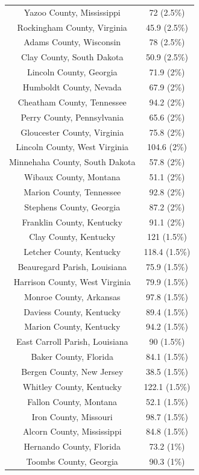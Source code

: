 \begin{table}[ht]
\begin{tabular}{cc}
  Yazoo County, Mississippi & 72 (2.5\%) \\ 
  Rockingham County, Virginia & 45.9 (2.5\%) \\ 
  Adams County, Wisconsin & 78 (2.5\%) \\ 
  Clay County, South Dakota & 50.9 (2.5\%) \\ 
  Lincoln County, Georgia & 71.9 (2\%) \\ 
  Humboldt County, Nevada & 67.9 (2\%) \\ 
  Cheatham County, Tennessee & 94.2 (2\%) \\ 
  Perry County, Pennsylvania & 65.6 (2\%) \\ 
  Gloucester County, Virginia & 75.8 (2\%) \\ 
  Lincoln County, West Virginia & 104.6 (2\%) \\ 
  Minnehaha County, South Dakota & 57.8 (2\%) \\ 
  Wibaux County, Montana & 51.1 (2\%) \\ 
  Marion County, Tennessee & 92.8 (2\%) \\ 
  Stephens County, Georgia & 87.2 (2\%) \\ 
  Franklin County, Kentucky & 91.1 (2\%) \\ 
  Clay County, Kentucky & 121 (1.5\%) \\ 
  Letcher County, Kentucky & 118.4 (1.5\%) \\ 
  Beauregard Parish, Louisiana & 75.9 (1.5\%) \\ 
  Harrison County, West Virginia & 79.9 (1.5\%) \\ 
  Monroe County, Arkansas & 97.8 (1.5\%) \\ 
  Daviess County, Kentucky & 89.4 (1.5\%) \\ 
  Marion County, Kentucky & 94.2 (1.5\%) \\ 
  East Carroll Parish, Louisiana & 90 (1.5\%) \\ 
  Baker County, Florida & 84.1 (1.5\%) \\ 
  Bergen County, New Jersey & 38.5 (1.5\%) \\ 
  Whitley County, Kentucky & 122.1 (1.5\%) \\ 
  Fallon County, Montana & 52.1 (1.5\%) \\ 
  Iron County, Missouri & 98.7 (1.5\%) \\ 
  Alcorn County, Mississippi & 84.8 (1.5\%) \\ 
  Hernando County, Florida & 73.2 (1\%) \\ 
  Toombs County, Georgia & 90.3 (1\%) \\ 

\end{tabular}
\end{table}
